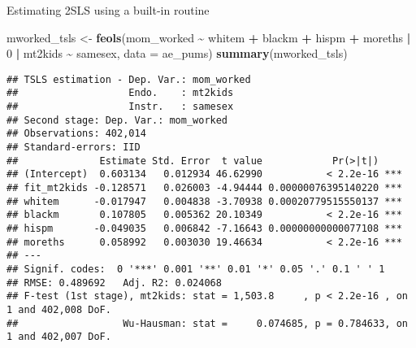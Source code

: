 \documentclass[
  ignorenonframetext,
]{beamer}
\newenvironment{Shaded}{\begin{snugshade}}{\end{snugshade}}
\newcommand{\AttributeTok}[1]{\textcolor[rgb]{0.13,0.29,0.53}{#1}}
\newcommand{\DecValTok}[1]{\textcolor[rgb]{0.00,0.00,0.81}{#1}}
\newcommand{\FunctionTok}[1]{\textcolor[rgb]{0.13,0.29,0.53}{\textbf{#1}}}
\newcommand{\NormalTok}[1]{#1}
\newcommand{\OtherTok}[1]{\textcolor[rgb]{0.56,0.35,0.01}{#1}}
\newcommand{\SpecialCharTok}[1]{\textcolor[rgb]{0.81,0.36,0.00}{\textbf{#1}}}
\begin{document}
\begin{frame}[fragile]{Estimating 2SLS using a built-in routine}
\label{estimating-2sls-using-a-built-in-routine-1}
\tiny

\begin{Shaded}
\begin{Highlighting}[]
\NormalTok{mworked\_tsls }\OtherTok{\textless{}{-}} \FunctionTok{feols}\NormalTok{(mom\_worked }\SpecialCharTok{\textasciitilde{}}\NormalTok{ whitem }\SpecialCharTok{+}\NormalTok{ blackm }\SpecialCharTok{+}\NormalTok{ hispm }\SpecialCharTok{+}\NormalTok{ moreths }\SpecialCharTok{|} 
                \DecValTok{0} \SpecialCharTok{|} 
\NormalTok{                mt2kids }\SpecialCharTok{\textasciitilde{}}\NormalTok{ samesex,}
              \AttributeTok{data =}\NormalTok{ ae\_pums)}
\FunctionTok{summary}\NormalTok{(mworked\_tsls)}
\end{Highlighting}
\end{Shaded}

\begin{verbatim}
## TSLS estimation - Dep. Var.: mom_worked
##                   Endo.    : mt2kids
##                   Instr.   : samesex
## Second stage: Dep. Var.: mom_worked
## Observations: 402,014
## Standard-errors: IID 
##              Estimate Std. Error  t value            Pr(>|t|)    
## (Intercept)  0.603134   0.012934 46.62990           < 2.2e-16 ***
## fit_mt2kids -0.128571   0.026003 -4.94444 0.00000076395140220 ***
## whitem      -0.017947   0.004838 -3.70938 0.00020779515550137 ***
## blackm       0.107805   0.005362 20.10349           < 2.2e-16 ***
## hispm       -0.049035   0.006842 -7.16643 0.00000000000077108 ***
## moreths      0.058992   0.003030 19.46634           < 2.2e-16 ***
## ---
## Signif. codes:  0 '***' 0.001 '**' 0.01 '*' 0.05 '.' 0.1 ' ' 1
## RMSE: 0.489692   Adj. R2: 0.024068
## F-test (1st stage), mt2kids: stat = 1,503.8     , p < 2.2e-16 , on 1 and 402,008 DoF.
##                  Wu-Hausman: stat =     0.074685, p = 0.784633, on 1 and 402,007 DoF.
\end{verbatim}
\end{frame}
\end{document}
